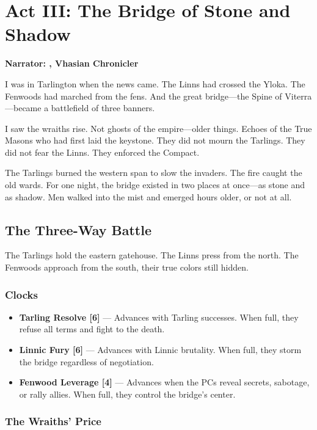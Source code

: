 \documentclass[11pt,a5paper]{book}
\newcommand{\clock}[1]{\textbf{[#1]}}
\begin{document}
\clearpage

\chapter{Act III: The Bridge of Stone and Shadow}
\textbf{Narrator: \mavron, Vhasian Chronicler}

\epigraph{I was in Tarlington when the news came. The Linns had crossed the Yloka. The Fenwoods had marched from the fens. And the great bridge---the Spine of Viterra---became a battlefield of three banners.}{\mavron}

\lettrine{I}{} saw the wraiths rise. Not ghosts of the empire---older things. Echoes of the True Masons who had first laid the keystone. They did not mourn the Tarlings. They did not fear the Linns. They enforced the Compact.

The Tarlings burned the western span to slow the invaders. The fire caught the old wards. For one night, the bridge existed in two places at once---as stone and as shadow. Men walked into the mist and emerged hours older, or not at all.

\section*{The Three-Way Battle}

The Tarlings hold the eastern gatehouse. The Linns press from the north. The Fenwoods approach from the south, their true colors still hidden.

\subsection*{Clocks}
\begin{itemize}[leftmargin=*]
\item \textbf{Tarling Resolve \clock{6}} --- Advances with Tarling successes. When full, they refuse all terms and fight to the death.
\item \textbf{Linnic Fury \clock{6}} --- Advances with Linnic brutality. When full, they storm the bridge regardless of negotiation.
\item \textbf{Fenwood Leverage \clock{4}} --- Advances when the PCs reveal secrets, sabotage, or rally allies. When full, they control the bridge's center.
\end{itemize}

\subsection*{The Wraiths' Price}
\end{document}
